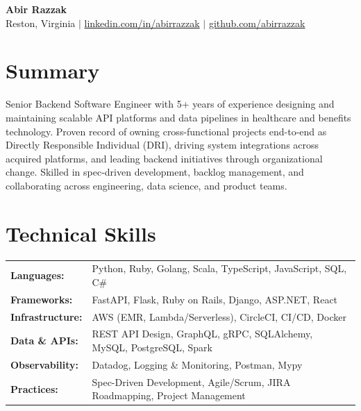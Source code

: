\documentclass[11pt,letterpaper]{article}
\begin{document}
\begin{center}
    {\LARGE\bfseries Abir Razzak} \\[4pt]
        Reston, Virginia \quad $\mid$ \quad
            \href{https://www.linkedin.com/in/abirrazzak}{linkedin.com/in/abirrazzak} \quad $\mid$ \quad
                \href{https://github.com/abirrazzak}{github.com/abirrazzak}
                \end{center}

                \section{Summary}
                Senior Backend Software Engineer with 5+ years of experience designing and maintaining scalable API platforms and data pipelines in healthcare and benefits technology. Proven record of owning cross-functional projects end-to-end as Directly Responsible Individual (DRI), driving system integrations across acquired platforms, and leading backend initiatives through organizational change. Skilled in spec-driven development, backlog management, and collaborating across engineering, data science, and product teams.

                \section{Technical Skills}
                \begin{tabular}{@{} l l}
                \textbf{Languages:} & Python, Ruby, Golang, Scala, TypeScript, JavaScript, SQL, C\# \\
                \textbf{Frameworks:} & FastAPI, Flask, Ruby on Rails, Django, ASP.NET, React \\
                \textbf{Infrastructure:} & AWS (EMR, Lambda/Serverless), CircleCI, CI/CD, Docker \\
                \textbf{Data \& APIs:} & REST API Design, GraphQL, gRPC, SQLAlchemy, MySQL, PostgreSQL, Spark \\
                \textbf{Observability:} & Datadog, Logging \& Monitoring, Postman, Mypy \\
                \textbf{Practices:} & Spec-Driven Development, Agile/Scrum, JIRA Roadmapping, Project Management \\
                \end{tabular}
\end{document}
